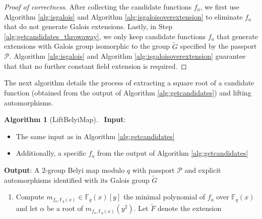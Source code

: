 \documentclass{dcthesis}
\newcommand{\mm}[1]{{\color{blue} \sf MM: [#1]}}
\newcommand{\wt}[1]{\widetilde{#1}}
\newcommand{\FF}{\mathbb{F}}
\numberwithin{equation}{section}
\theoremstyle{definition}
\newtheorem{alg}[equation]{Algorithm}
\theoremstyle{remark}
\begin{document}
{{{\begin{proof}[Proof of correctness]
      After collecting the candidate functions
      $f_a$,
      we first use
      Algorithm
      \ref{alg:isgalois}
      and
      Algorithm
      \ref{alg:isgaloisoverextension}
      to eliminate $f_a$ that
      do not generate Galois extensions.
      Lastly,
      in Step
      \ref{alg:getcandidates_throwaway},
      we only keep candidate functions
      $f_a$ that generate extensions
      with Galois group isomorphic
      to the group
      $\wt{G}$ specified by the passport
      $\mathcal{P}$.
      Algorithm
      \ref{alg:isgalois}
      and Algorithm
      \ref{alg:isgaloisoverextension}
      guarantee that that no
      further constant field extension is
      required.
    \end{proof}
    The next algorithm details
    the process of extracting a square root
    of a candidate function
    (obtained from the output of
    Algorithm \ref{alg:getcandidates})
    and lifting automorphisms.
    \begin{alg}[LiftBelyiMap]
      \label{alg:liftbelyimap}
      \,
      \newline
      \textbf{Input}:
      \begin{itemize}
        \item
          The same input as in
          Algorithm
          \ref{alg:getcandidates}
        \item
          Additionally,
          a specific
          $f_a$ from the output of
          Algorithm
          \ref{alg:getcandidates}
      \end{itemize}
      \textbf{Output}:
      A $2$-group Belyi map modulo $q$
      with passport $\mathcal{P}$
      and explicit automorphisms
      identified with its Galois group
      $\wt{G}$
      \begin{enumerate}
        \item
          Compute $m_{f_a,\FF_q(x)}\in\FF_q(x)[y]$
          the minimal polynomial of $f_a$
          over $\FF_q(x)$
          and let $\alpha$ be
          a root of $m_{f_a,\FF_q(x)}(y^2)$.
          Let $\wt{F}$ denote the extension

\end{enumerate}
\end{alg}}}}
\end{document}
